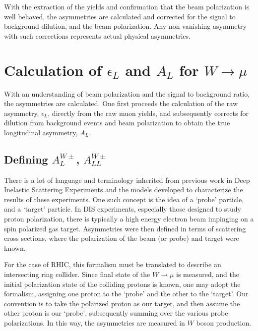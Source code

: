 With the extraction of the yields and confirmation that the beam polarization is
well behaved, the asymmetries are calculated and corrected for the signal to
background dilution, and the beam polarization. Any non-vanishing asymmetry with
such corrections represents actual physical asymmetries.

\clearpage
\section{Calculation of $\epsilon_L$ and $A_{L}$ for $W\rightarrow\mu$}
\label{sec:calculate_al}

With an understanding of beam polarization and the signal to background ratio,
the asymmetries are calculated. One first proceeds the calculation of the raw
asymmetry, $\epsilon_L$, directly from the raw muon yields, and subsequently
corrects for dilution from background events and beam polarization to obtain the
true longitudinal asymmetry, $A_L$.

\subsection{Defining $A_L^{W\pm}$, $A_{LL}^{W\pm}$}

There is a lot of language and terminology inherited from previous work in Deep
Inelastic Scattering Experiments and the models developed to characterize the
results of these experiments. One such concept is the idea of a `probe'
particle, and a `target' particle. In DIS experiments, especially those designed
to study proton polarization, there is typically a high energy electron beam
impinging on a spin polarized gas target. Asymmetries were then defined in terms
of scattering cross sections, where the polarization of the beam (or probe) and
target were known.

For the case of RHIC, this formalism must be translated to describe an
intersecting ring collider. Since final state of the $W\rightarrow\mu$ is
measured, and the initial polarization state of the colliding protons is known,
one may adopt the formalism, assigning one proton to the `probe' and the other
to the `target'.  Our convention is to take the polarized proton as our target,
and then assume the other proton is our `probe', subsequently summing over the
various probe polarizations. In this way, the asymmetries are measured in $W$
boson production.

